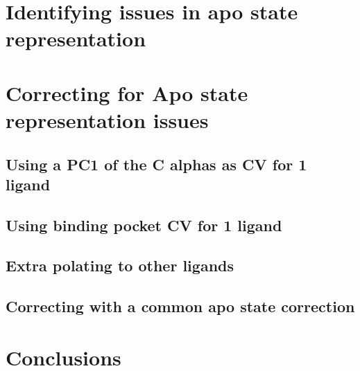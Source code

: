\lipsum[1][1-3]

\section{Identifying issues in apo state representation}

\lipsum[1][1-3]

\section{Correcting for Apo state representation issues}

\lipsum[1][1-3]

\subsection{Using a PC1 of the C alphas as CV for 1 ligand}

\lipsum[1][1-3]

\subsection{Using binding pocket CV for 1 ligand}

\lipsum[1][1-3]

\subsection{Extra polating to other ligands}

\lipsum[1][1-3]

\subsection{Correcting with a common apo state correction}

\lipsum[1][1-3]

\section{Conclusions}
\lipsum[1][1-3]
